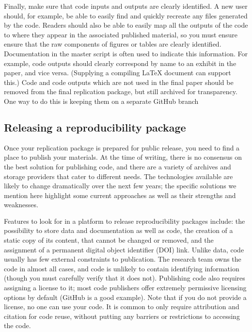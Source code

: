 Finally, make sure that code inputs and outputs are clearly identified.
A new user should, for example, be able to easily find and quickly recreate
any files generated by the code.
Readers should also be able to easily map all the outputs of the code
to where they appear in the associated published material,
so you must ensure ensure that the raw components of figures or tables are clearly identified.
Documentation in the master script is often used to indicate this information.
For example, code outputs should clearly correspond by name to an exhibit in the paper, and vice versa.
(Supplying a compiling {\LaTeX} document can support this.)
Code and code outputs which are not used in the final paper should be removed from the final replication package,
but still archived for transparency.
One way to do this is keeping them on a separate GitHub branch

\subsection{Releasing a reproducibility package}

Once your replication package is prepared for public release,
you need to find a place to publish your materials.
At the time of writing, there is no consensus on the best solution for publishing code,
and there are a variety of archives and storage providers
that cater to different needs.
The technologies available are likely to change dramatically
over the next few years;
the specific solutions we mention here highlight some current approaches
as well as their strengths and weaknesses.

Features to look for in a platform to release reproducibility packages include:
the possibility to store data and documentation as well as code,
the creation of a static copy of its content, that cannot be changed or removed,
and the assignment of a permanent digital object identifier (DOI) link.
Unlike data, code usually has few external constraints to publication.
The research team owns the code in almost all cases,
and code is unlikely to contain identifying information
(though you must carefully verify that it does not).
Publishing code also requires assigning a license to it;
most code publishers offer extremely permissive licensing options by default (GitHub is a good example).
Note that if you do not provide a license, no one can use your code.
It is common to only require attribution and citation for code reuse,
without putting any barriers or restrictions to accessing the code.

